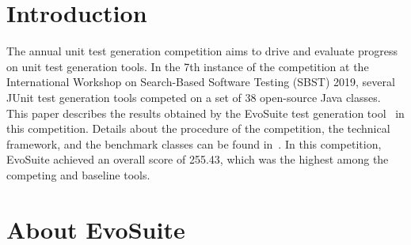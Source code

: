 \documentclass[sigconf,table]{acmart}
\newcommand{\TODO}[1]{\textbf{\textcolor{ScarletRed}{[TODO: #1]}}\xspace}
\newcommand{\TODO}[1]{}
\newcommand{\EVOSUITE}{{\sc EvoSuite}\xspace}
\newcommand{\JTEXPERT}{{\sc jTExpert}\xspace}
\newcommand{\RANDOOP}{{\sc Randoop}\xspace}
\newcommand{\TT}{{\sc T3}\xspace}
\newcommand{\TOTALPOINTS}{{255.43}\xspace}
\newcommand{\NumCUTS}{{38}\xspace}
\begin{document}
\section{Introduction}
The annual unit test generation competition aims to drive and evaluate
progress on unit test generation tools. In the 7th instance of the
competition at the International Workshop on Search-Based Software
Testing (SBST) 2019, several JUnit test generation tools
competed on a set of \NumCUTS open-source Java classes. %
This paper describes the results obtained by the \EVOSUITE
test generation tool~\cite{FrA11c} in this competition. Details about
the procedure of the competition, the technical framework, and the
benchmark classes can be found in~\cite{sbst19competition}.  In this
competition, \EVOSUITE achieved an overall score of \TOTALPOINTS,
which was the highest among the competing and baseline
tools.

\section{About EvoSuite}
\end{document}
